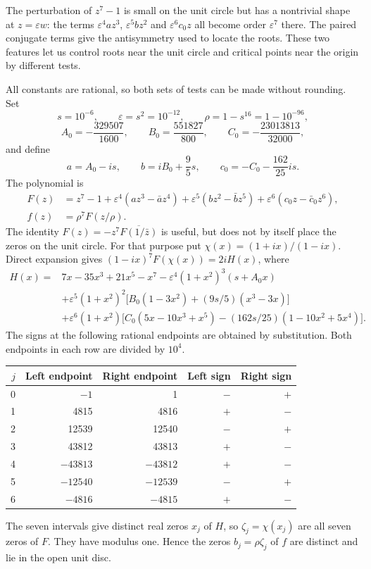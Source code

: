 \documentclass[11pt]{article}
\begin{document}
The perturbation of $z^7-1$ is small on the unit circle but has a
nontrivial shape at $z=\varepsilon w$: the terms
$\varepsilon^4az^3$, $\varepsilon^5bz^2$ and
$\varepsilon^6c_0z$ all become order $\varepsilon^7$ there.
The paired conjugate terms give the antisymmetry used to locate the
roots. These two features let us control roots near the unit circle
and critical points near the origin by different tests.

All constants are rational, so both sets of tests can be made without
rounding. Set
\[
 s=10^{-6},\qquad \varepsilon=s^2=10^{-12},\qquad
 \rho=1-s^{16}=1-10^{-96},
\]
\[
 A_0=-\frac{329507}{1600},\qquad B_0=\frac{551827}{800},\qquad
 C_0=-\frac{23013813}{32000},
\]
and define
\[
 a=A_0-is,\qquad b=iB_0+\frac95s,\qquad
 c_0=-C_0-\frac{162}{25}is.
\]
The polynomial is
\begin{align}
 F(z)&=z^7-1+\varepsilon^4(az^3-\bar a z^4)
       +\varepsilon^5(bz^2-\bar b z^5)
       +\varepsilon^6(c_0z-\bar c_0z^6),\label{eq:ani-F-long}\\
 f(z)&=\rho^7 F(z/\rho).\label{eq:ani-f-long}
\end{align}
The identity $F(z)=-z^7\overline{F(1/\bar z)}$ is useful, but does not by
itself place the zeros on the unit circle. For that purpose put
$\chi(x)=(1+ix)/(1-ix)$. Direct expansion gives
$(1-ix)^7 F(\chi(x))=2iH(x)$, where
\begin{align*}
 H(x)={}&7x-35x^3+21x^5-x^7
 -\varepsilon^4(1+x^2)^3(s+A_0x)\\
 &+\varepsilon^5(1+x^2)^2
       \bigl[B_0(1-3x^2)+(9s/5)(x^3-3x)\bigr]\\
 &+\varepsilon^6(1+x^2)
       \bigl[C_0(5x-10x^3+x^5)
          -(162s/25)(1-10x^2+5x^4)\bigr].
\end{align*}
The signs at the following rational endpoints are obtained by substitution.
Both endpoints in each row are divided by $10^4$.
\begin{center}
\begin{tabular}{@{}rrrrr@{}}
\toprule
$j$ & Left endpoint & Right endpoint & Left sign & Right sign\\
\midrule
0&$-1$&1&$-$&$+$\\
1&4815&4816&$+$&$-$\\
2&12539&12540&$-$&$+$\\
3&43812&43813&$+$&$-$\\
4&$-43813$&$-43812$&$+$&$-$\\
5&$-12540$&$-12539$&$-$&$+$\\
6&$-4816$&$-4815$&$+$&$-$\\
\bottomrule
\end{tabular}
\end{center}
The seven intervals give distinct real zeros $x_j$ of $H$, so
$\zeta_j=\chi(x_j)$ are all seven zeros of $F$. They have modulus one.
Hence the zeros $b_j=\rho\zeta_j$ of $f$ are distinct and lie in the open
unit disc.
\end{document}
